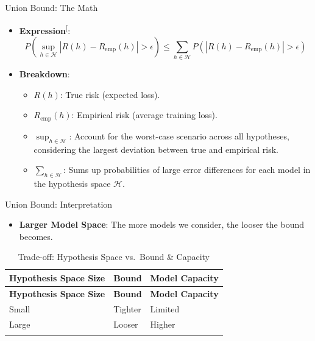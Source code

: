 \documentclass[
  ignorenonframetext,
]{beamer}
\providecommand{\tightlist}{%
  \setlength{\itemsep}{0pt}\setlength{\parskip}{0pt}}\usepackage{longtable,booktabs,array}
\begin{document}
\begin{frame}{Union Bound: The Math}
\label{union-bound-the-math}
\begin{itemize}
\tightlist
\item
  \textbf{Expression}\textsuperscript{{[}\citeproc{ref-samir16}{4}{]}}:
  \[
  P\left(\sup_{h \in \mathcal{H}} |R(h) - R_{\text{emp}}(h)| > \epsilon \right) \leq \sum_{h \in \mathcal{H}} P\left(|R(h) - R_{\text{emp}}(h)| > \epsilon \right)
  \]
\item
  \textbf{Breakdown}:

  \begin{itemize}
  \tightlist
  \item
    \(R(h)\): True risk (expected loss).
  \item
    \(R_{\text{emp}}(h)\): Empirical risk (average training loss).
  \item
    \(\sup_{h \in \mathcal{H}}\): Account for the worst-case scenario
    across all hypotheses, considering the largest deviation between
    true and empirical risk.
  \item
    \(\sum_{h \in \mathcal{H}}\): Sums up probabilities of large error
    differences for each model in the hypothesis space \(\mathcal{H}\).
  \end{itemize}
\end{itemize}
\end{frame}

\begin{frame}{Union Bound: Interpretation}
\label{union-bound-interpretation}
\begin{itemize}
\tightlist
\item
  \textbf{Larger Model Space}: The more models we consider, the looser
  the bound becomes.
\end{itemize}

\begin{longtable}[]{@{}lll@{}}
\caption{Trade-off: Hypothesis Space vs.~Bound \&
Capacity}\tabularnewline
\toprule\noalign{}
\textbf{Hypothesis Space Size} & \textbf{Bound} & \textbf{Model
Capacity} \\
\midrule\noalign{}
\endfirsthead
\toprule\noalign{}
\textbf{Hypothesis Space Size} & \textbf{Bound} & \textbf{Model
Capacity} \\
\midrule\noalign{}
\endhead
Small & Tighter & Limited \\
Large & Looser & Higher \\
\bottomrule\noalign{}
\end{longtable}
\end{frame}
\end{document}
